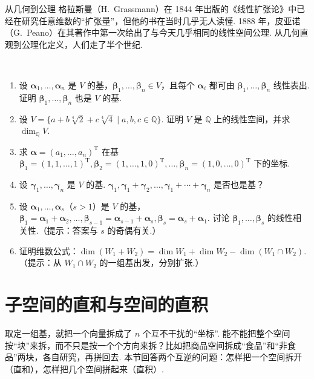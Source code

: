 \documentclass[lang=cn,10.5pt,scheme=chinese,toc=twocol,section,chinesefont=nofont,
twoside,citestyle=gb7714-2015,bibstyle=gb7714-2015]{elegantbook}
\DeclareRobustCommand{\textbf}[1]{{\lnsemiboldlatin\lnsemiboldcjk #1}}
\newcommand{\vv}[1]{\boldsymbol{#1}}
\newcommand{\trans}{\mathrm{T}}             %
\numberwithin{equation}{section}   %
\newcommand{\hC}{\texorpdfstring{\textdaggerdbl}{‡}}
\newcommand*{\lnlabel}[1]{{\sffamily\bfseries\color{black}#1}}
\renewenvironment{exercise}[1][]{%
	\refstepcounter{exer}%
	\par\noindent\makebox[-3pt][r]{\scriptsize\color{black}\HandPencilLeft\quad}%
	\lnlabel{\exercisename\ \theexer\ifblank{#1}{}{\ #1}}\ \rmfamily}{%
	\par\ignorespacesafterend}
\begin{document}
\begin{historybox}{从几何到公理}
  格拉斯曼（H.~Grassmann）在 1844 年出版的《线性扩张论》\cite{grassmann1844ausdehnungslehre}中已经在研究任意维数的“扩张量”，但他的书在当时几乎无人读懂. 1888 年，皮亚诺（G.~Peano）在其著作\cite{peano1888calcolo}中第一次给出了与今天几乎相同的线性空间公理. 从几何直观到公理化定义，人们走了半个世纪.
\end{historybox}

\begin{exercise}
  \label{exer:coord}
  \begin{enumerate}
    \item 设 $\vv{\alpha}_1,\ldots,\vv{\alpha}_n$ 是 $V$ 的基，$\vv{\beta}_1,\ldots,\vv{\beta}_n\in V$，且每个 $\vv\alpha_i$ 都可由 $\vv{\beta}_1,\ldots,\vv{\beta}_n$ 线性表出. 证明 $\vv{\beta}_1,\ldots,\vv{\beta}_n$ 也是 $V$ 的基.
    \item 设 $V=\{a+b\sqrt[4]{2}+c\sqrt[4]{4}\mid a,b,c\in\mathbb{Q}\}$. 证明 $V$ 是 $\mathbb{Q}$ 上的线性空间，并求 $\dim_{\mathbb{Q}}V$.
    \item 求 $\vv{\alpha} = (a_1, \ldots, a_n)^\trans$ 在基 $\vv{\beta}_1 = (1, 1, \ldots, 1)^\trans, \vv{\beta}_2 = (1, \ldots, 1, 0)^\trans, \ldots, \vv{\beta}_n = (1, 0, \ldots, 0)^\trans$ 下的坐标.
    \item 设 $\vv{\gamma}_1, \ldots, \vv{\gamma}_n$ 是 $V$ 的基. $\vv{\gamma}_1, \vv{\gamma}_1 + \vv{\gamma}_2, \ldots, \vv{\gamma}_1 + \cdots + \vv{\gamma}_n$ 是否也是基？
    \item 设 $\vv{\alpha}_1, \ldots, \vv{\alpha}_s$（$s>1$）是 $V$ 的基，$\vv{\beta}_1 = \vv{\alpha}_1 + \vv{\alpha}_2, \ldots, \vv{\beta}_{s-1} = \vv{\alpha}_{s-1} + \vv{\alpha}_s, \vv{\beta}_s = \vv{\alpha}_s + \vv{\alpha}_1$. 讨论 $\vv{\beta}_1, \ldots, \vv{\beta}_s$ 的线性相关性.（提示：答案与 $s$ 的奇偶有关.）
    \item 证明维数公式：$\dim(W_1+W_2)=\dim W_1+\dim W_2-\dim(W_1\cap W_2)$.（提示：从 $W_1\cap W_2$ 的一组基出发，分别扩张.）
  \end{enumerate}
\end{exercise}

\section{\hC 子空间的直和与空间的直积}\label{sec:directsum}

\begin{motivebox}
  取定一组基，就把一个向量拆成了 $n$ 个互不干扰的“坐标”. 能不能把整个空间按“块”来拆，而不只是按一个个方向来拆？比如把商品空间拆成“食品”和“非食品”两块，各自研究，再拼回去. 本节回答两个互逆的问题：怎样把一个空间\textbf{拆开}（直和），怎样把几个空间\textbf{拼起来}（直积）.
\end{motivebox}
\end{document}
